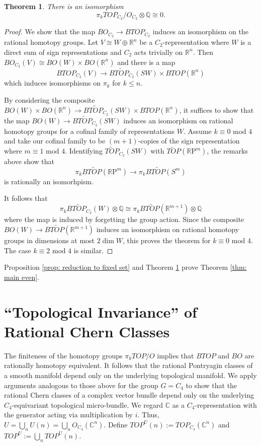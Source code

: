 \documentclass[11pt, twoside]{amsart}
\theoremstyle{plain}
\newtheorem{theorem}{Theorem}[section]
\theoremstyle{definition}
\theoremstyle{remark}
\newcommand{\R}{\mathbb R}
\newcommand{\Q}{\mathbb Q}
\newcommand{\C}{\mathbb C}
\newcommand{\RP}{\mathbb R\text{P}}
\begin{document}
\begin{theorem}\label{thm: main thm C_2}
There is an isomorphism
\[
\pi_k TOP_{C_2}/O_{C_2}\otimes\Q\cong 0.
\]
\end{theorem}
\begin{proof}
We show that the map $BO_{C_2}\rightarrow BTOP_{C_2}$ induces an isomorphism on the rational homotopy groups.
Let $V\cong W\oplus\R^n$ be a $C_2$-representation where $W$ is a direct sum of sign representations and $C_2$ acts trivially on $\R^n$.
Then $BO_{C_2}(V)\cong BO(W)\times BO(\R^n)$ and there is a map
\[
BTOP_{C_2}(V)\rightarrow B\widetilde{TOP}_{C_2}(SW)\times BTOP(\R^n)
\]
which induces isomorphisms on $\pi_k$ for $k\le n$.

By considering the composite $BO(W)\times BO(\R^n)\rightarrow B\widetilde{TOP}_{C_2}(SW)\times BTOP(\R^n)$, it suffices to show that the map $BO(W)\rightarrow B\widetilde{TOP}_{C_2}(SW)$ induces an isomorphism on rational homotopy groups for a cofinal family of representations $W$.
Assume $k\equiv0\text{ mod }4$ and take our cofinal family to be $(m+1)$-copies of the sign representation where $m\equiv1\text{ mod }4$.
Identifying $\widetilde{TOP}_{C_2}(SW)$ with $\widetilde{TOP}(\RP^m)$, the remarks above show that
\[
\pi_kB\widetilde{TOP}(\RP^m)\rightarrow\pi_kB\widetilde{TOP}(S^m)
\]
is rationally an isomorhpism.

It follows that
\[
\pi_kB\widetilde{TOP}_{C_2}(W)\otimes\Q\cong\pi_kB\widetilde{TOP}(\R^{m+1})\otimes\Q
\]
where the map is induced by forgetting the group action.
Since the composite $BO(W)\rightarrow B\widetilde{TOP}(\R^{m+1})$ induces an isomorphism on rational homotopy groups in dimensions at most $2\dim W$, this proves the theorem for $k\equiv0\text{ mod }4$.
The case $k\equiv2\text{ mod }4$ is similar.
\end{proof}

Proposition \ref{prop: reduction to fixed set} and Theorem \ref{thm: main thm C_2} prove Theorem \ref{thm: main even}.

\section{``Topological Invariance'' of Rational Chern Classes}\label{sec: chern classes}
The finiteness of the homotopy groups $\pi_kTOP/O$ implies that $BTOP$ and $BO$ are rationally homotopy equivalent.
It follows that the rational Pontryagin classes of a smooth manifold depend only on the underlying topological manifold.
We apply arguments analogous to those above for the group $G=C_4$ to show that the rational Chern classes of a complex vector bundle depend only on the underlying $C_4$-equivariant topological micro-bundle.
We regard $\C$ as a $C_4$-representation with the generator acting via multiplication by $i$.
Thus, $U=\bigcup_n U(n)=\bigcup_n O_{C_4}(\C^n)$.
Define $TOP^U(n):=TOP_{C_4}(\C^n)$ and $TOP^U:=\bigcup_n TOP^U(n)$.
\end{document}
